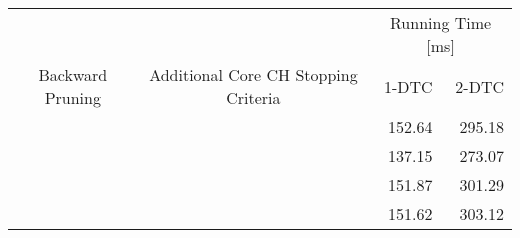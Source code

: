 \begin{tabular}{ccrr}
	\toprule
	                 &                                      & \multicolumn{2}{c}{Running Time [\si{\milli\second}]}         \\
	Backward Pruning & Additional Core CH Stopping Criteria & 1-DTC                                                 & 2-DTC \\
	\midrule
	\xmark           & \xmark                               & 152.64                                                     & 295.18     \\
	\cmark           & \xmark                               & 137.15                                                     & 273.07     \\
	\xmark           & \cmark                               & 151.87                                                     & 301.29     \\
	\cmark           & \cmark                               & 151.62                                                     & 303.12     \\
	\bottomrule
\end{tabular}